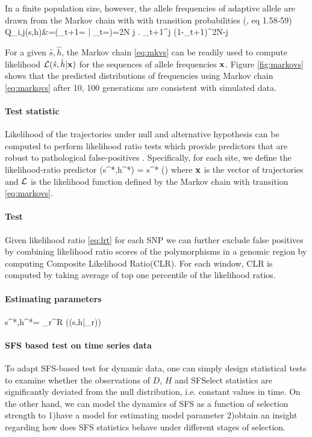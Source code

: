 \documentclass[11pt]{article}
\def\comale{\text{COMALE }}
\begin{document}
In a finite population size, however, the allele frequencies of adaptive allele are drawn from the Markov chain with with transition 
probabilities 
(\cite{Ewens2012Mathematical}, eq 1.58-59)
\beq
Q_{i,j}(s,h)&=\pr\left(\nu_{t+1}= \left| 
\nu_{t}=\right)={2N 
	\choose j} \right. 
\nu_{t+1}^{j} (1-\nu_{t+1})^{2N-j}\label{eq:mkvs}
\eeq

For a given $\hat{s},\hat{h}$, the Markov chain \ref{eq:mkvs} can be readily used to
compute likelihood ${\cal L}(\hat{s},\hat{h}|{\mathbf x})$ for the sequences of allele frequencies ${\mathbf x}$.
Figure \ref{fig:markovs} shows that the predicted distributions of 
frequencies using Markov chain \ref{eq:markovs} after 10, 100 generations are consistent with simulated data.
\paragraph{Test statistic}
Likelihood of the trajectories under null and alternative 
hypothesis can be 
computed to perform likelihood ratio tests which provide 
predictors that are 
robust to pathological false-positives 
\cite{feder2014Identifying}. 
Specifically, for each site, we define the likelihood-ratio 
predictor
\beq \label{eq:lrt}
\Lambda(s^*,h^*) = s^*\log 
\left(\right)
\eeq
where ${\mathbf x}$ is the vector of trajectories and ${\cal L}$ is the 
likelihood function 
defined by the Markov chain with transition 
\eqref{eq:markovs}.
\paragraph{\comale Test}
Given likelihood ratio \eqref{eq:lrt} for each SNP we can further exclude false 
positives by combining likelihood ratio scores of the polymorphisms in a 
genomic region by computing Composite 
Likelihood 
Ratio(CLR)\cite{nielsen2005genomic,williamson2007localizing,vitti2013detecting}.
For each window, CLR is computed by taking average of top one percentile of the 
likelihood ratios.
\paragraph{Estimating parameters} 
\label{sec:regression}
\beq
s^*,h^*= \sum_r^R \log \left(\Lc(s,h|\bfx_r)\right)
\eeq
\paragraph{SFS based test on time series data}\label{sec:sfs-ts}
To adapt SFS-based test for dynamic data, one can simply design statistical 
tests to examine whether the 
observations of $D$, $H$ and SFSelect statistics are 
significantly deviated 
from the null distribution, i.e. constant values in time.
On the other hand, we can model the dynamics of SFS as a 
function of selection 
strength to 1)have a model for estimating model parameter 2)obtain an insight 
regarding how does SFS statistics behave under different 
stages of selection.
\end{document}
